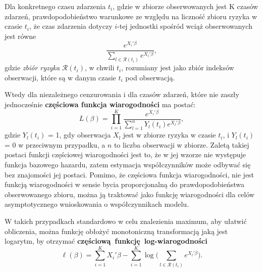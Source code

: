 Dla konkretnego czasu zdarzenia $t_i$, gdzie w zbiorze obserwowanych jest K czasów zdarzeń, prawdopodobieństwo warunkowe ze względu na liczność zbioru ryzyka w czasie $t_i$, że czas zdarzenia dotyczy $i$-tej jednostki spośród wciąż obserwowanych jest równe
\begin{equation}
\dfrac{e^{X_i'\beta}}{\sum\limits_{l\in \mathscr{R}(t_i)}^{}e^{X_l'\beta}},
\end{equation}
gdzie \textit{zbiór ryzyka} $\mathscr{R}(t_i)$, w chwili $t_i$, rozumiany jest jako zbiór indeksów obserwacji, które są w danym czasie $t_i$ pod obserwacją.

Wtedy dla niezależnego cenzurowania i dla czasów zdarzeń, które nie zaszły jednocześnie \textbf{częściowa funkcja wiarogodności} ma postać:
\begin{equation}
L(\beta) = \prod\limits_{i=1}^{K}\dfrac{e^{X_i'\beta}}{\sum\limits_{l=1}^{n}Y_l(t_i)e^{X_l'\beta}},
\end{equation}
gdzie $Y_l(t_i)$ = 1, gdy obserwacja $X_l$ jest w zbiorze ryzyka w czasie $t_i$, i $Y_l(t_i)$ = 0 w przeciwnym przypadku, a $n$ to liczba obserwacji w zbiorze. Zaletą takiej postaci funkcji częściowej wiarogodności jest to, że w jej wzorze nie występuje funkcja bazowego hazardu, zatem estymacja współczynników może odbywać się bez znajomości jej postaci. Pomimo, że częściowa funkcja wiarogodności, nie jest funkcją wiarogodności w sensie bycia proporcjonalną do prawdopodobieństwa obserwowanego zbioru, można ją traktować jako funkcję wiarogodności dla celów asymptotycznego wnioskowania o współczynnikach modelu.

W takich przypadkach standardowo w celu znalezienia maximum, aby ułatwić obliczenia, można funkcję obłożyć monotoniczną transformacją jaką jest logarytm, by otrzymać \textbf{częściową~funkcję~log-wiarogodności}
\begin{equation}
\ell(\beta) = \sum\limits_{i=1}^{K}X_i'\beta - \sum\limits_{i=1}^{K}\log\Big(\sum\limits_{l\in \mathscr{R}(t_i)}^{}e^{X_l'\beta}\Big).
\end{equation}



